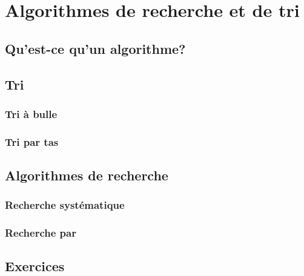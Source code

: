 \chapter{Algorithmes de recherche et de tri}
\section{Qu’est-ce qu’un algorithme?}
\section{Tri}
\subsection{Tri \`a bulle}
\subsection{Tri par tas}

\section{Algorithmes de recherche}
\subsection{Recherche syst\'ematique}
\subsection{Recherche par }

\section{Exercices}
